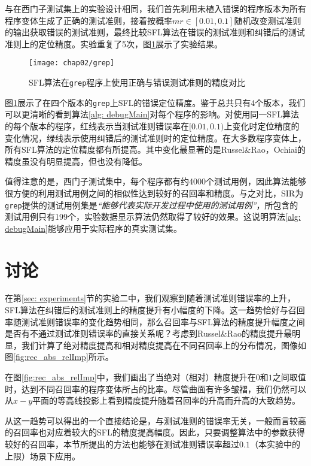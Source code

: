 与在西门子测试集上的实验设计相同，我们首先利用未植入错误的程序版本为所有程序变体生成了正确的测试准则，接着按概率$mr\in [0.01, 0.1]$随机改变测试准则的输出获取错误的测试准则，最终比较SFL算法在错误的测试准则和纠错后的测试准则上的定位精度。实验重复了5次，图\ref{Fig: grep}展示了实验结果。

\begin{figure}
	\texttt{[image: chap02/grep]}
	\caption{SFL算法在\texttt{grep}程序上使用正确与错误测试准则的精度对比}
	\label{Fig: grep}
\end{figure}

图\ref{Fig: grep}展示了在四个版本的\texttt{grep}上SFL的错误定位精度。鉴于总共只有4个版本，我们可以更清晰的看到算法\ref{alg: debugMain}对每个程序的影响。对使用同一SFL算法的每个版本的程序，红线表示当测试准则错误率在$[0.01,0.1)$上变化时定位精度的变化情况，绿线表示使用纠错后的测试准则时的定位精度。在大多数程序变体上，所有SFL算法的定位精度都有所提高。其中变化最显著的是Russel\&Rao，Ochiai的精度虽没有明显提高，但也没有降低。

值得注意的是，西门子测试集中，每个程序都有约4000个测试用例，因此算法能够很方便的利用测试用例之间的相似性达到较好的召回率和精度。与之对比，SIR为\texttt{grep}提供的测试用例集是\textit{“能够代表实际开发过程中使用的测试用例”}\cite{doESE05}，所包含的测试用例只有199个，实验数据显示算法仍然取得了较好的效果。这说明算法\ref{alg: debugMain}能够应用于实际程序的真实测试集。

\section{讨论}
在第\ref{sec: experiments}节的实验二中，我们观察到随着测试准则错误率的上升，SFL算法在纠错后的测试准则上的精度提升有小幅度的下降。这一趋势恰好与召回率随测试准则错误率的变化趋势相同，那么召回率与SFL算法的精度提升幅度之间是否有不通过测试准则错误率的直接关系呢？考虑到Russel\&Rao的精度提升最明显，我们计算了绝对精度提高和相对精度提高在不同召回率上的分布情况，图像如图\ref{fig:rec_abs_relImp}所示。

在图\ref{fig:rec_abs_relImp}中，我们画出了当绝对（相对）精度提升在$0$和$1$之间取值时，达到不同召回率的程序变体所占的比率。尽管曲面有许多皱褶，我们仍然可以从$x-y$平面的等高线投影上看到精度提升随着召回率的升高而升高的大致趋势。

从这一趋势可以得出的一个直接结论是，与测试准则的错误率无关，一般而言较高的召回率也对应着较大的SFL的精度提高幅度。因此，只要调整算法中的参数获得较好的召回率，本节所提出的方法也能够在测试准则错误率超过$0.1$（本实验中的上限）场景下应用。

